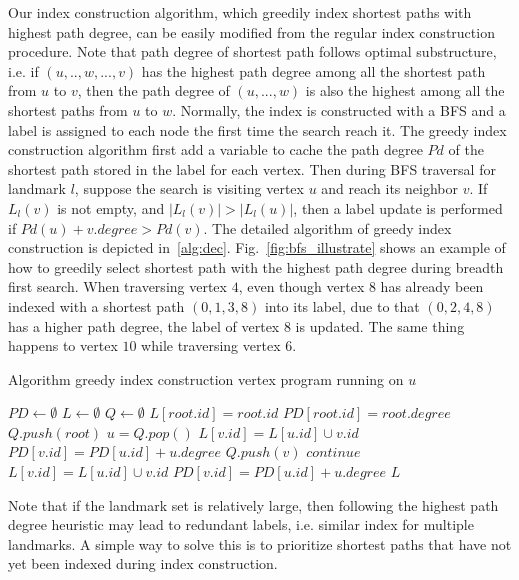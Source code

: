 Our index construction algorithm, which greedily index shortest paths with highest path degree, can be easily modified from the regular index construction procedure. Note that path degree of shortest path follows optimal substructure, i.e. if $(u, .., w, ..., v)$ has the highest path degree among all the shortest path from $u$ to $v$, then the path degree of $(u, ..., w)$ is also the highest among all the shortest paths from $u$ to $w$. Normally, the index is constructed with a BFS and a label is assigned to each node the first time the search reach it. The greedy index construction algorithm first add a variable to cache the path degree $Pd$ of the shortest path stored in the label for each vertex. Then during BFS traversal for landmark $l$, suppose the search is visiting vertex $u$ and reach its neighbor $v$. If $L_l(v)$ is not empty, and $|L_l(v)| > |L_l(u)|$, then a label update is performed if $Pd(u) + v.degree > Pd(v)$. The detailed algorithm of greedy index construction is depicted in~\ref{alg:dec}. Fig.~\ref{fig:bfs_illustrate} shows an example of how to greedily select shortest path with the highest path degree during breadth first search. When traversing vertex $4$, even though vertex $8$ has already been indexed with a shortest path $(0, 1, 3, 8)$ into its label, due to that $(0, 2, 4, 8)$ has a higher path degree, the label of vertex $8$ is updated. The same thing happens to vertex $10$ while traversing vertex $6$. 

\begin{algorithm}[h]
    \caption{Algorithm greedy index construction vertex program running on $u$}
		\label{alg:ind}
    \begin{algorithmic}
					\State $PD \gets \emptyset$
					\State $L \gets \emptyset$
					\State $Q \gets \emptyset$
					\State $L[root.id] = root.id$
					\State $PD[root.id] = root.degree$
					\State $Q.push(root)$
						\State $u = Q.pop()$
								\State $L[v.id] = L[u.id] \cup v.id$
								\State $PD[v.id] = PD[u.id] + u.degree$
								\State $Q.push(v)$
							\ElsIf{$L(v).size() < L(u).size() + 1$}
								\State $continue$
							\ElsIf{PD[v.id] < PD[u.id] + u.degree}
								\State $L[v.id] = L[u.id] \cup v.id$
								\State $PD[v.id] = PD[u.id] + u.degree$
							\EndIf
						\EndFor
					\EndWhile
					\State \Return $L$
        \EndFunction
    \end{algorithmic}
\end{algorithm}

Note that if the landmark set is relatively large, then following the highest path degree heuristic may lead to redundant labels, i.e. similar index for multiple landmarks. A simple way to solve this is to prioritize shortest paths that have not yet been indexed during index construction.
